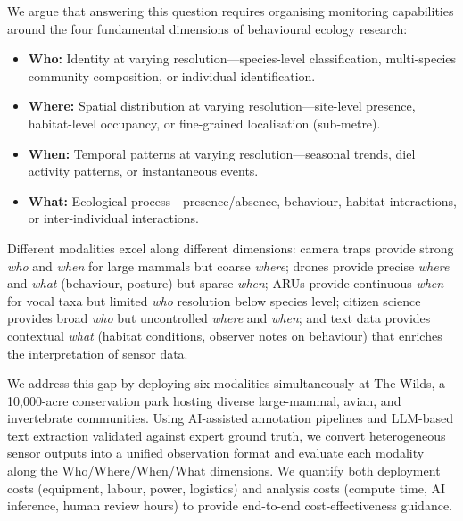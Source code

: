 \documentclass[12pt]{article}
\begin{document}
We argue that answering this question requires organising monitoring capabilities around the four fundamental dimensions of behavioural ecology research:
\begin{itemize}
    \item \textbf{Who:} Identity at varying resolution---species-level classification, multi-species community composition, or individual identification.
    \item \textbf{Where:} Spatial distribution at varying resolution---site-level presence, habitat-level occupancy, or fine-grained localisation (sub-metre).
    \item \textbf{When:} Temporal patterns at varying resolution---seasonal trends, diel activity patterns, or instantaneous events.
    \item \textbf{What:} Ecological process---presence/absence, behaviour, habitat interactions, or inter-individual interactions.
\end{itemize}
Different modalities excel along different dimensions: camera traps provide strong \textit{who} and \textit{when} for large mammals but coarse \textit{where}; drones provide precise \textit{where} and \textit{what} (behaviour, posture) but sparse \textit{when}; ARUs provide continuous \textit{when} for vocal taxa but limited \textit{who} resolution below species level; citizen science provides broad \textit{who} but uncontrolled \textit{where} and \textit{when}; and text data provides contextual \textit{what} (habitat conditions, observer notes on behaviour) that enriches the interpretation of sensor data.

We address this gap by deploying six modalities simultaneously at The Wilds, a 10,000-acre conservation park hosting diverse large-mammal, avian, and invertebrate communities. Using AI-assisted annotation pipelines and LLM-based text extraction validated against expert ground truth, we convert heterogeneous sensor outputs into a unified observation format and evaluate each modality along the Who/Where/When/What dimensions. We quantify both deployment costs (equipment, labour, power, logistics) and analysis costs (compute time, AI inference, human review hours) to provide end-to-end cost-effectiveness guidance.
\end{document}
